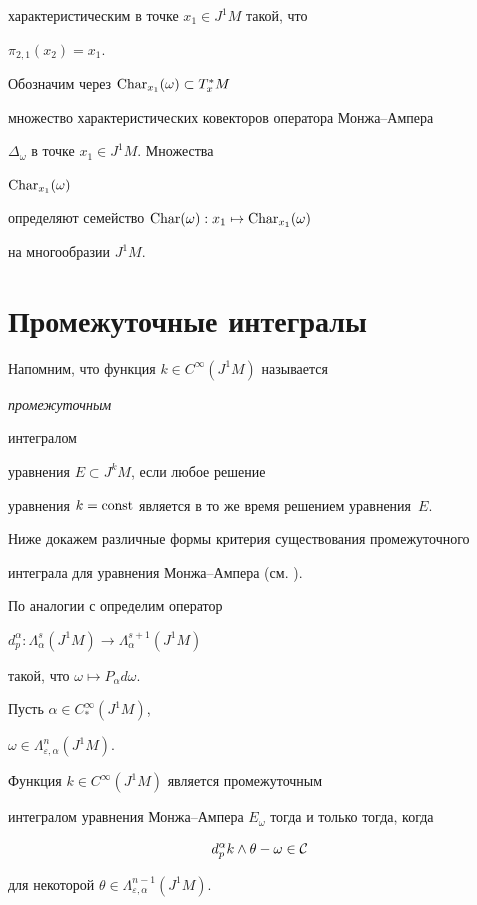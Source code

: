 характеристическим в точке $x_1\in J^1M$ такой, что 


$\pi_{2,1}(x_2)=x_1$.





Обозначим через $\operatorname{Char}_{x_1}(\omega )\subset T_x^{*}M$ 


множество характеристических ковекторов оператора Монжа--Ампера


$\Delta_\omega $ в точке $x_1\in J^1M$. Множества 


${\operatorname{Char}}_{x_1}(\omega )$


определяют семейство ${\operatorname{Char}}(\omega ):x_1\mapsto {\operatorname{Char}}_{x_1}(\omega )$ 


на многообразии $J^1M$.





\section{Промежуточные интегралы}





Напомним, что функция $k\in C^\infty (J^1M)$ называется {\em промежуточным 


интегралом} уравнения $E\subset J^kM$, если любое решение


уравнения $k=\operatorname{const}$ является в то же время решением уравнения~$E$.





Ниже докажем различные формы критерия существования промежуточного


интеграла для уравнения Монжа--Ампера (см. \cite{zilbergleit2}).





По аналогии с {\cite{lychagin2}} определим оператор


$d_p^\alpha:\Lambda_\alpha^s(J^1M)\to\Lambda_\alpha^{s+1}(J^1M)$ 


такой, что $\omega \mapsto P_\alpha d\omega $.





\begin{prop}


Пусть $\alpha \in C_{*}^\infty (J^1M)$,


$\omega \in \Lambda_{\varepsilon,\alpha }^n(J^1M)$.


Функция $k\in C^\infty (J^1M)$ является промежуточным


интегралом уравнения Монжа--Ампера $E_\omega $ тогда и только тогда, когда


\begin{equation}


d_p^\alpha k\wedge \theta -\omega \in {\cal C} \label{intint0}


\end{equation}


для некоторой $\theta \in \Lambda_{\varepsilon ,\alpha }^{n-1}(J^1M)$.


\end{prop}





